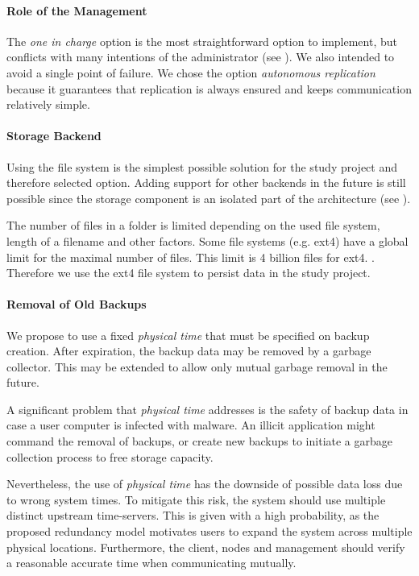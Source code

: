 \paragraph{Role of the Management}
The \emph{one in charge} option is the most straightforward option to implement, but conflicts with many intentions of the administrator (see ). We also intended to avoid a single point of failure. We chose the option \emph{autonomous replication} because it guarantees that replication is always ensured and keeps communication relatively simple.

\paragraph{Storage Backend}
Using the file system is the simplest possible solution for the study project and therefore selected option. Adding support for other backends in the future is still possible since the storage component is an isolated part of the architecture (see ).

The number of files in a folder is limited depending on the used file system, length of a filename and other factors. Some file systems (e.g. ext4) have a global limit for the maximal number of files. This limit is 4 billion files for ext4. \cite{ext4}. Therefore we use the ext4 file system to persist data in the study project.

\paragraph{Removal of Old Backups}\label{sec:removal-of-old-backups}
We propose to use a fixed \emph{physical time} that must be specified on backup creation. After expiration, the backup data may be removed by a garbage collector. This may be extended to allow only mutual garbage removal in the future.

A significant problem that \emph{physical time} addresses is the safety of backup data in case a user computer is infected with malware. An illicit application might command the removal of backups, or create new backups to initiate a garbage collection process to free storage capacity.

Nevertheless, the use of \emph{physical time} has the downside of possible data loss due to wrong system times. To mitigate this risk, the system should use multiple distinct upstream time-servers. This is given with a high probability, as the proposed redundancy model motivates users to expand the system across multiple physical locations. Furthermore, the client, \glspl{node} and \gls{management} should verify a reasonable accurate time when communicating mutually.

